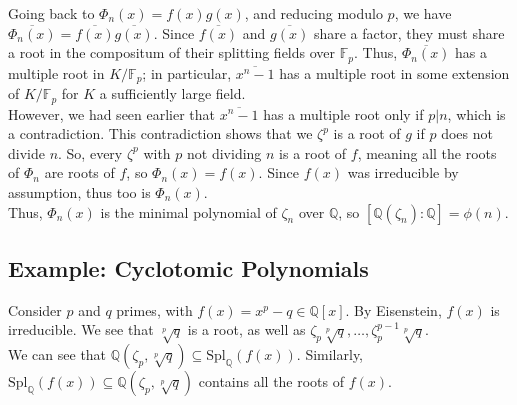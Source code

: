\documentclass[10pt]{extarticle}
\newcommand{\Q}{\mathbb{Q}}
\begin{document}
  Going back to $\Phi_n(x) = f(x)g(x)$, and reducing modulo $p$, we have $\overline{\Phi_n(x)} = \overline{f(x)}\overline{g(x)}$. Since $\overline{f(x)}$ and $\overline{g(x)}$ share a factor, they must share a root in the compositum of their splitting fields over $\mathbb{F}_p$. Thus, $\overline{\Phi_n(x)}$ has a multiple root in $K/\mathbb{F}_p$; in particular, $\overline{x^{n}-1}$ has a multiple root in some extension of $K/\mathbb{F}_p$ for $K$ a sufficiently large field.\\

  However, we had seen earlier that $\overline{x^n-1}$ has a multiple root only if $p|n$, which is a contradiction. This contradiction shows that we $\zeta^{p}$ is a root of $g$ if $p$ does not divide $n$. So, every $\zeta^p$ with $p$ not dividing $n$ is a root of $f$, meaning all the roots of $\Phi_n$ are roots of $f$, so $\Phi_n(x) = f(x)$. Since $f(x)$ was irreducible by assumption, thus too is $\Phi_n(x)$.\\

  Thus, $\Phi_n(x)$ is the minimal polynomial of $\zeta_n$ over $\Q$, so $[\Q(\zeta_n):\Q] = \phi(n)$.
  \subsection{Example: Cyclotomic Polynomials}%
    Consider $p$ and $q$ primes, with $f(x) = x^{p}-q\in \Q[x]$. By Eisenstein, $f(x)$ is irreducible. We see that $\sqrt[p]{q}$ is a root, as well as $\zeta_p\sqrt[p]{q},\dots,\zeta_p^{p-1}\sqrt[p]{q}$.\\

    We can see that $\Q(\zeta_p,\sqrt[p]{q})\subseteq \text{Spl}_{\Q}(f(x))$. Similarly, $\text{Spl}_{\Q}(f(x))\subseteq \Q(\zeta_p,\sqrt[p]{q})$ contains all the roots of $f(x)$.
    \begin{center}
    \end{center}
\end{document}
